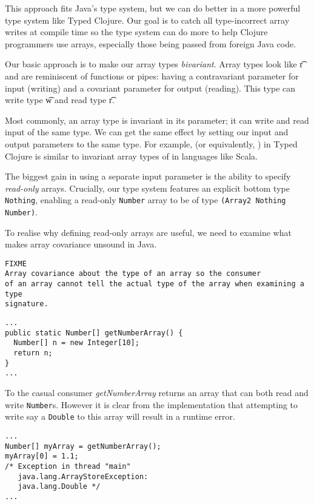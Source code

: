 \documentclass[preprint,10pt]{sigplanconf}
\begin{document}
This approach fits Java's type system, but we can do better in a more powerful
type system like Typed Clojure. Our goal is to catch all type-incorrect array
writes at compile time so the type system can do more to help Clojure programmers
use arrays, especially those being passed from foreign Java code.

Our basic approach is to make our array types \emph{bivariant}. Array types
look like { {\t{r}}} and
are reminiscent of functions or pipes: having a contravariant parameter for input (writing)
and a covariant parameter for output (reading).
This type can write type {\t{w}} and read type {\t{r}}.

Most commonly, an array type is invariant in its parameter; it can
write and read input of the same type.
We can get the same effect by setting our input and output
parameters to the same type. For example, {\ArrayTwo {\Number} {\Number}}
(or equivalently, {\Array {\Number}})
in Typed Clojure is similar to invariant array types of \Number in languages like Scala.

The biggest gain in using a separate input parameter is the ability
to specify \emph{read-only} arrays. Crucially, our type system features an
explicit bottom type \lstinline|Nothing|, enabling a read-only \lstinline|Number| array
to be of type \lstinline|(Array2 Nothing Number)|.

To realise why defining read-only arrays are useful, we need to examine
what makes array covariance unsound in Java.
\begin{verbatim}
FIXME
Array covariance about the type of an array so the consumer
of an array cannot tell the actual type of the array when examining a type
signature.
\end{verbatim}

\begin{lstlisting}
...
public static Number[] getNumberArray() {
  Number[] n = new Integer[10];
  return n;
}
...
\end{lstlisting}

To the casual consumer \emph{getNumberArray} returns an array that can both
read and write \lstinline|Number|s. However it is clear from the implementation
that attempting to write say a \lstinline|Double| to this array will result
in a runtime error.

\begin{verbatim}
...
Number[] myArray = getNumberArray();
myArray[0] = 1.1;
/* Exception in thread "main" 
   java.lang.ArrayStoreException: 
   java.lang.Double */
...
\end{verbatim}
\end{document}

